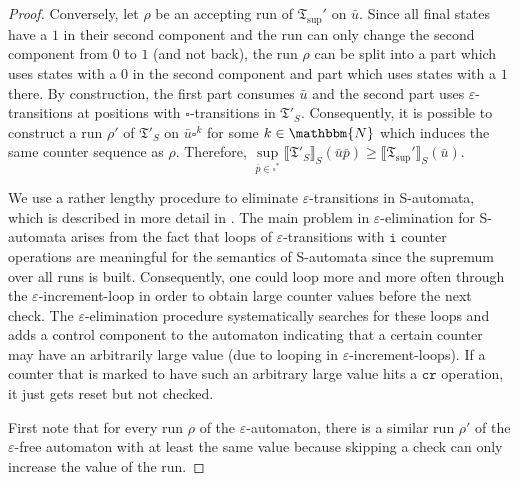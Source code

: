 \documentclass{LMCS}
\newcommand{\nat}{\mathbbm{N}}
\newcommand{\eps}{\varepsilon}
\newcommand{\pad}{\square}
\newcommand{\automatonT}{\mathfrak T}
\newcommand{\semantics}[1]{\llbracket#1\rrbracket}
\newcommand{\iOp}{\ensuremath{\mathtt{i}}}
\newcommand{\crOp}{\ensuremath{\mathtt{c\! r}}}
\begin{document}
\begin{proof}
	Conversely, let $\rho$ be an accepting run of $\automatonT_{\sup}'$ on $\bar
u$. Since all final states have a $1$ in their second component and the run 
can only change the second component from $0$ to $1$ (and not back), the run
$\rho$ can be split into a part which uses states with a $0$ in the second
component and part which uses states with a $1$ there. By construction, the
first part consumes $\bar u$ and the second part uses $\eps$-transitions at
positions with $\pad$-transitions in $\automatonT'_S$. Consequently, it is
possible to construct a run $\rho'$ of $\automatonT'_S$ on $\bar u \pad^k$ for
some $k \in \nat$ which induces the same counter sequence as $\rho$. Therefore,
$\sup\limits_{\bar p \in \pad^*} \semantics{\automatonT'_S}_S(\bar u \bar p) \ge
\semantics{\automatonT_{\sup}'}_S(\bar u)$.


We use a rather lengthy procedure to eliminate $\eps$-transitions in S-automata,
which is described in more detail in \cite{la11}. The main problem in 
$\eps$-elimination for S-automata arises from the fact that loops of 
$\eps$-transitions with $\iOp$ counter operations are meaningful for the 
semantics of S-automata since the supremum over all runs is built. Consequently,
one could loop more and more often through the $\eps$-increment-loop in order
to obtain large counter values before the next check. The $\eps$-elimination 
procedure systematically searches for these loops and adds a control component 
to the automaton indicating that a certain counter may have an arbitrarily 
large value (due to looping in $\eps$-increment-loops). 
If a counter that is marked to have such an arbitrary large value hits a 
$\crOp$ operation, it just gets reset but not checked. 

First note that for every run $\rho$ of the $\eps$-automaton, there is a similar 
run $\rho'$ of the $\eps$-free automaton with at least the same value because
skipping a check can only increase the value of the run. 


\end{proof}
\end{document}
